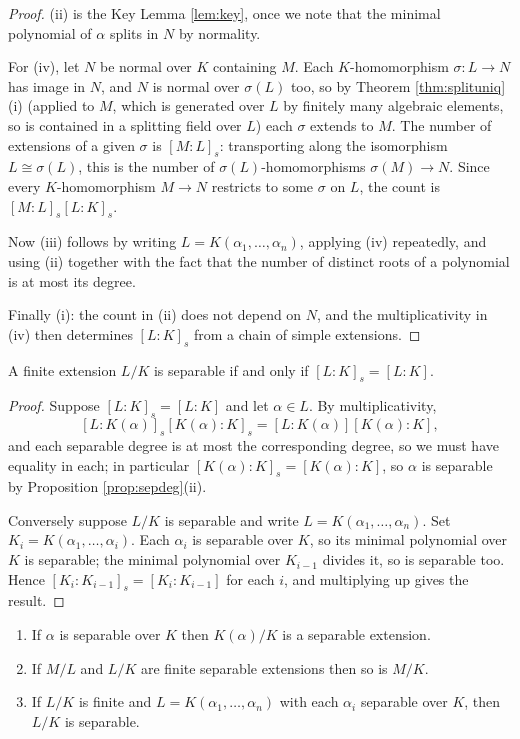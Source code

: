 \begin{proof}
	(ii) is the Key Lemma \ref{lem:key}, once we note that the minimal polynomial of $\alpha$ splits in $N$ by normality.

	For (iv), let $N$ be normal over $K$ containing $M$. Each $K$-homomorphism $\sigma : L \to N$ has image in $N$, and $N$ is normal over $\sigma(L)$ too, so by Theorem \ref{thm:splituniq}(i) (applied to $M$, which is generated over $L$ by finitely many algebraic elements, so is contained in a splitting field over $L$) each $\sigma$ extends to $M$. The number of extensions of a given $\sigma$ is $[M:L]_s$: transporting along the isomorphism $L \cong \sigma(L)$, this is the number of $\sigma(L)$-homomorphisms $\sigma(M) \to N$. Since every $K$-homomorphism $M \to N$ restricts to some $\sigma$ on $L$, the count is $[M:L]_s[L:K]_s$.

	Now (iii) follows by writing $L = K(\alpha_1, \dots, \alpha_n)$, applying (iv) repeatedly, and using (ii) together with the fact that the number of distinct roots of a polynomial is at most its degree.

	Finally (i): the count in (ii) does not depend on $N$, and the multiplicativity in (iv) then determines $[L:K]_s$ from a chain of simple extensions.
\end{proof}

\begin{theorem}\label{thm:sepiffdeg}
	A finite extension $L/K$ is separable if and only if $[L:K]_s = [L:K]$.
\end{theorem}

\begin{proof}
	Suppose $[L:K]_s = [L:K]$ and let $\alpha \in L$. By multiplicativity,
	$$[L:K(\alpha)]_s[K(\alpha):K]_s = [L:K(\alpha)][K(\alpha):K],$$
	and each separable degree is at most the corresponding degree, so we must have equality in each; in particular $[K(\alpha):K]_s = [K(\alpha):K]$, so $\alpha$ is separable by Proposition \ref{prop:sepdeg}(ii).

	Conversely suppose $L/K$ is separable and write $L = K(\alpha_1, \dots, \alpha_n)$. Set $K_i = K(\alpha_1, \dots, \alpha_i)$. Each $\alpha_i$ is separable over $K$, so its minimal polynomial over $K$ is separable; the minimal polynomial over $K_{i-1}$ divides it, so is separable too. Hence $[K_i : K_{i-1}]_s = [K_i:K_{i-1}]$ for each $i$, and multiplying up gives the result.
\end{proof}

\begin{corollary}\label{cor:septower}
	\begin{enumerate}[label=(\roman*)]
		\item If $\alpha$ is separable over $K$ then $K(\alpha)/K$ is a separable extension.
		\item If $M/L$ and $L/K$ are finite separable extensions then so is $M/K$.
		\item If $L/K$ is finite and $L = K(\alpha_1, \dots, \alpha_n)$ with each $\alpha_i$ separable over $K$, then $L/K$ is separable.
	\end{enumerate}
\end{corollary}

